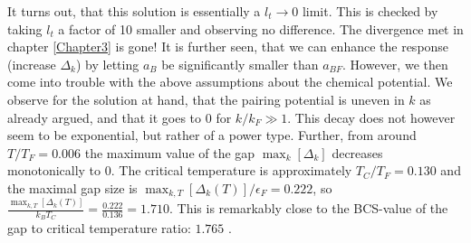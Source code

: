 It turns out, that this solution is essentially a $l_t \to 0$ limit. This is checked by taking $l_t$ a factor of 10 smaller and observing no difference. The divergence met in chapter \ref{Chapter3} is gone! It is further seen, that we can enhance the response (increase $\Delta_k$) by letting $a_B$ be significantly smaller than $a_{BF}$. However, we then come into trouble with the above assumptions about the chemical potential. We observe for the solution at hand, that the pairing potential is uneven in $k$ as already argued, and that it goes to 0 for $k/k_F \gg 1$. This decay does not however seem to be exponential, but rather of a power type. Further, from around $T/T_F = 0.006$ the maximum value of the gap $\max_k[\Delta_k]$ decreases monotonically to 0. The critical temperature is approximately $T_C/T_F = 0.130$ and the maximal gap size is $\max_{k,T}[\Delta_k(T)]/\epsilon_F = 0.222$, so $\frac{\max_{k,T}[\Delta_k(T)]}{k_B T_C} = \frac{0.222}{0.136} = 1.710$. This is remarkably close to the BCS-value of the gap to critical temperature ratio: $1.765$ \cite{BruusFlensberg}. 
